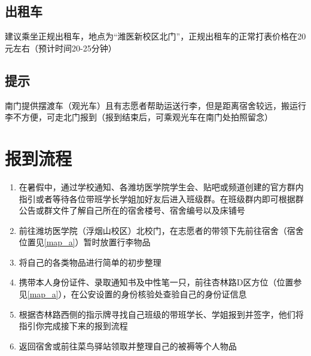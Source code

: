 \subsection[出租车]{出租车}
建议乘坐正规出租车，地点为“潍医新校区北门”，正规出租车的正常打表价格在20元左右（预计时间20-25分钟）

\subsection[提示]{提示}
南门提供摆渡车（观光车）且有志愿者帮助运送行李，但是距离宿舍较远，搬运行李不方便，可走北门报到（报到结束后，可乘观光车在南门处拍照留念）

\section[报到流程]{报到流程}
\begin{enumerate}
    \item 在暑假中，通过学校通知、各潍坊医学院学生会、贴吧或频道创建的官方群内指引或者等待各位带班学长学姐加好友后进入班级群。在班级群内即可根据群公告或群文件了解自己所在的宿舍楼号、宿舍编号以及床铺号
    \item 前往潍坊医学院（浮烟山校区）北校门，在志愿者\footnotemark 的带领下先前往宿舍（宿舍位置见\uline{\ref{map_a}}）暂时放置行李物品
    \item 将自己的各类物品进行简单的初步整理
    \item 携带本人身份证件、录取通知书\footnotemark 及中性笔一只，前往杏林路D区方位（位置参见\uline{\ref{map_a}}），在公安设置的身份核验处查验自己的身份证信息
    \item 根据杏林路西侧的指示牌寻找自己班级的带班学长、学姐报到并签字，他们将指引你完成接下来的报到流程\footnotemark
    \item 返回宿舍或前往菜鸟驿站领取并整理自己的被褥等个人物品
\end{enumerate}